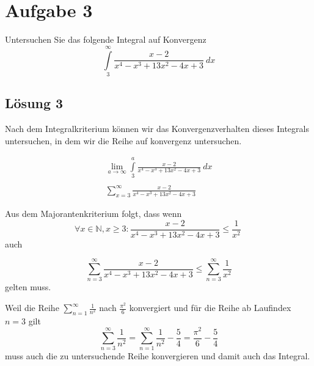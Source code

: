 \documentclass[main.tex]{subfiles}
\begin{document}
\section{Aufgabe 3}
Untersuchen Sie das folgende Integral auf Konvergenz
\begin{equation*}
    \int\limits _{3}^{\infty }\frac{x-2}{x^{4} -x^{3} +13x^{2} -4x+3} \ dx
\end{equation*}

\subsection{Lösung 3}
Nach dem Integralkriterium können wir das Konvergenzverhalten dieses Integrals untersuchen, in dem wir die Reihe auf konvergenz untersuchen.

\begin{gather*}
    \lim _{a\rightarrow \infty }\int\limits _{3}^{a}\frac{x-2}{x^{4} -x^{3} +13x^{2} -4x+3} \ dx\\
    \\
    \sum _{x=3}^{\infty }\frac{x-2}{x^{4} -x^{3} +13x^{2} -4x+3}
\end{gather*}

Aus dem Majorantenkriterium folgt, dass wenn
\begin{equation*}
    \forall x\in \mathbb{N} ,x\geq 3:\frac{x-2}{x^{4} -x^{3} +13x^{2} -4x+3} \leq \frac{1}{x^{2}} \ 
\end{equation*}auch

\begin{equation*}
\sum _{n=3}^{\infty }\frac{x-2}{x^{4} -x^{3} +13x^{2} -4x+3} \leq \sum _{n=3}^{\infty }\frac{1}{x^{2}}
\end{equation*}
gelten muss.

Weil die Reihe $\sum _{n=1}^{\infty }\frac{1}{n^{2}}$ nach $\frac{\pi ^{2}}{6}$ konvergiert und für die Reihe ab Laufindex $n=3$ gilt
\begin{equation*}
    \sum _{n=3}^{\infty }\frac{1}{n^{2}} =\sum _{n=1}^{\infty }\frac{1}{n^{2}} -\frac{5}{4} =\frac{\pi ^{2}}{6} -\frac{5}{4}
\end{equation*}
muss auch die zu untersuchende Reihe konvergieren und damit auch das Integral.
\end{document}
